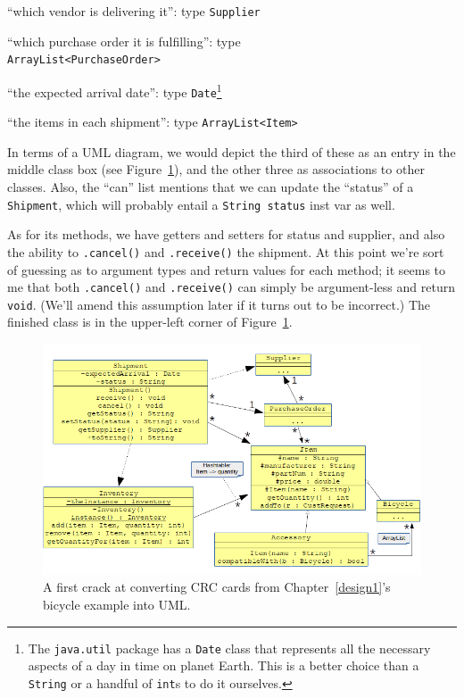 \begin{samepage}
\begin{compactitem}
\item ``which vendor is delivering it'': type \texttt{Supplier}
\item ``which purchase order it is fulfilling'': type\\
\hspace*{.2in} \texttt{ArrayList<PurchaseOrder>}
\item ``the expected arrival date'': type \texttt{Date}\footnote{The
\texttt{java.util} package has a \texttt{Date} class that represents all the
necessary aspects of a day in time on planet Earth. This is a better choice
than a \texttt{String} or a handful of \texttt{int}s to do it ourselves.}
\item ``the items in each shipment'': type \texttt{ArrayList<Item>}
\end{compactitem}
\end{samepage}

In terms of a UML diagram, we would depict the third of these as an entry in
the middle class box (see Figure~\ref{fig:bikeClassDiag}), and the other three
as associations to other classes. Also, the ``can'' list mentions that we can
update the ``status'' of a \texttt{Shipment}, which will probably entail a
\texttt{String status} inst var as well.

As for its methods, we have getters and setters for status and supplier, and
also the ability to \texttt{.cancel()} and \texttt{.receive()} the shipment. At
this point we're sort of guessing as to argument types and return values for
each method; it seems to me that both \texttt{.cancel()} and
\texttt{.receive()} can simply be argument-less and return \texttt{void}. (We'll
amend this assumption later if it turns out to be incorrect.) The finished
class is in the upper-left corner of Figure~\ref{fig:bikeClassDiag}.

\begin{figure}[ht]
\centering
\includegraphics[width=.95\textwidth]{bikeClassDiag.png}
\caption{A first crack at converting CRC cards from Chapter~\ref{design1}'s
bicycle example into UML.}
\label{fig:bikeClassDiag}
\end{figure}

